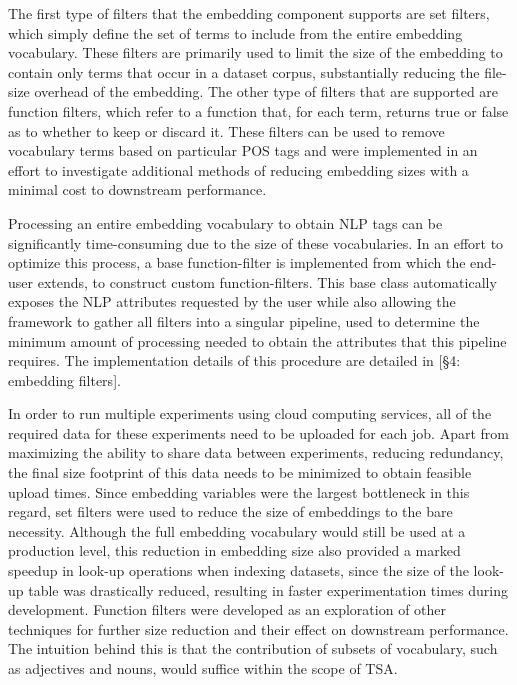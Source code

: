 \documentclass[12pt, a4paper]{report}
\theoremstyle{definition}
\theoremstyle{definition}%
\theoremstyle{definition}%
\theoremstyle{definition}%
\theoremstyle{definition}%
\theoremstyle{definition}%
\begin{document}
The first type of filters that the embedding component supports are set filters, which simply define the set of terms to include from the entire embedding vocabulary. These filters are primarily used to limit the size of the embedding to contain only terms that occur in a dataset corpus, substantially reducing the file-size overhead of the embedding. The other type of filters that are supported are function filters, which refer to a function that, for each term, returns true or false as to whether to keep or discard it. These filters can be used to remove vocabulary terms based on particular POS tags and were implemented in an effort to investigate additional methods of reducing embedding sizes with a minimal cost to downstream performance.

Processing an entire embedding vocabulary to obtain NLP tags can be significantly time-consuming due to the size of these vocabularies. In an effort to optimize this process, a base function-filter is implemented from which the end-user extends, to construct custom function-filters. This base class automatically exposes the NLP attributes requested by the user while also allowing the framework to gather all filters into a singular pipeline, used to determine the minimum amount of processing needed to obtain the attributes that this pipeline requires. The implementation details of this procedure are detailed in [\S4: embedding filters].

In order to run multiple experiments using cloud computing services, all of the required data for these experiments need to be uploaded for each job. Apart from maximizing the ability to share data between experiments, reducing redundancy, the final size footprint of this data needs to be minimized to obtain feasible upload times. Since embedding variables were the largest bottleneck in this regard, set filters were used to reduce the size of embeddings to the bare necessity. Although the full embedding vocabulary would still be used at a production level, this reduction in embedding size also provided a marked speedup in look-up operations when indexing datasets, since the size of the look-up table was drastically reduced, resulting in faster experimentation times during development. Function filters were developed as an exploration of other techniques for further size reduction and their effect on downstream performance. The intuition behind this is that the contribution of subsets of vocabulary, such as adjectives and nouns, would suffice within the scope of TSA.
\end{document}
